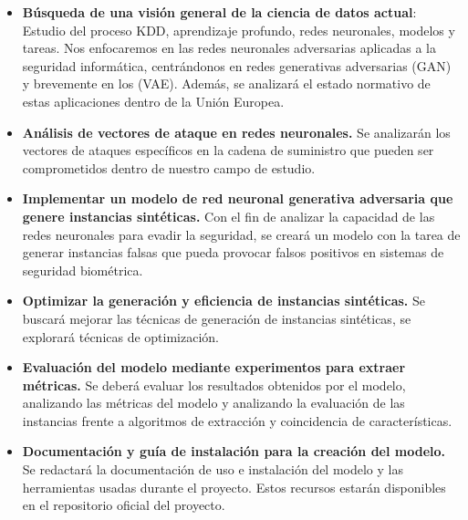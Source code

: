 \begin{itemize}
    \item \textbf{Búsqueda de una visión general de la ciencia de datos actual}: Estudio del proceso KDD, aprendizaje profundo, redes neuronales, modelos y tareas. Nos enfocaremos en las redes neuronales adversarias aplicadas a la seguridad informática, centrándonos en redes generativas adversarias (\gls{GAN}) y brevemente en los (\gls{VAE}). Además, se analizará el estado normativo de estas aplicaciones dentro de la Unión Europea.
    
    
    \item \textbf{Análisis de vectores de ataque en redes neuronales.} Se analizarán los vectores de ataques específicos en la cadena de suministro que pueden ser comprometidos dentro de nuestro campo de estudio.
  
    \item \textbf{Implementar un modelo de red neuronal generativa adversaria que genere instancias sintéticas.} Con el fin de analizar la capacidad de las redes neuronales para evadir la seguridad, se creará un modelo con la tarea de generar instancias falsas que pueda provocar falsos positivos en sistemas de seguridad biométrica.
    
    \item \textbf{Optimizar la generación y eficiencia de instancias sintéticas.} Se buscará mejorar las técnicas de generación de instancias sintéticas, se explorará técnicas de optimización.
    
    \item \textbf{Evaluación del modelo mediante experimentos para extraer métricas.} Se deberá evaluar los resultados obtenidos por el modelo, analizando las métricas del modelo y analizando la evaluación de las instancias frente a algoritmos de extracción y coincidencia de características. 

    \item \textbf{Documentación y guía de instalación para la creación del modelo.} Se redactará la documentación de uso e instalación del modelo y las herramientas usadas durante el proyecto. Estos recursos estarán disponibles en el repositorio oficial del proyecto.
    
\end{itemize}
